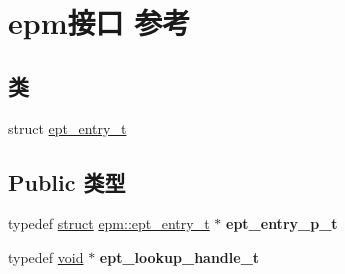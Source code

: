 \hypertarget{interfaceepm}{}\section{epm接口 参考}
\label{interfaceepm}
\subsection*{类}
\begin{DoxyCompactItemize}
\item 
struct \hyperlink{structepm_1_1ept__entry__t}{ept\+\_\+entry\+\_\+t}
\end{DoxyCompactItemize}
\subsection*{Public 类型}
\begin{DoxyCompactItemize}
\item 
\mbox{\label{interfaceepm_a50f0ee336aeaaa5b1fed93bb39e63a8e}} 
typedef \hyperlink{interfacestruct}{struct} \hyperlink{structepm_1_1ept__entry__t}{epm\+::ept\+\_\+entry\+\_\+t} $\ast$ {\bfseries ept\+\_\+entry\+\_\+p\+\_\+t}
\item 
\mbox{\label{interfaceepm_a28f8daa92cc8ecb02283cfaf5d8e5d66}} 
typedef \hyperlink{interfacevoid}{void} $\ast$ {\bfseries ept\+\_\+lookup\+\_\+handle\+\_\+t}
\end{DoxyCompactItemize}
